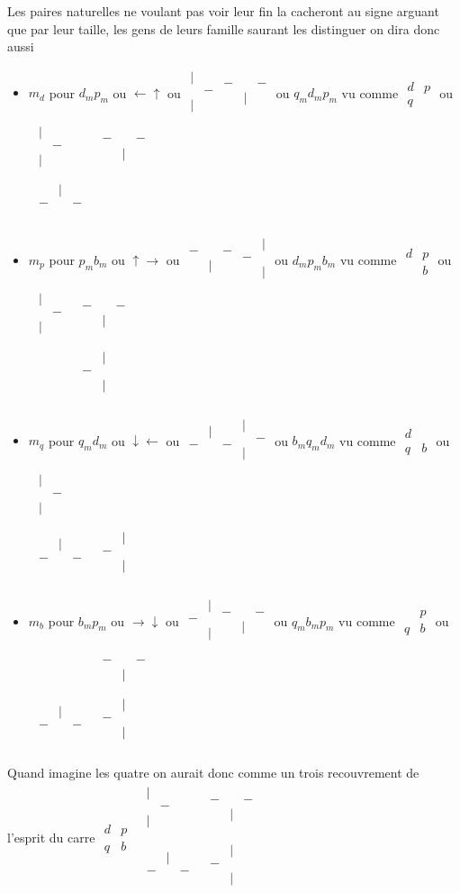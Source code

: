 \documentclass{article}
\newcommand{\dmat}{\scriptscriptstyle\begin{matrix}
|&   \\
  & - \\
 | &   \\
\end{matrix}}
\newcommand{\pmat}{\scriptscriptstyle\begin{matrix}
&  & \\
 - &&  -\\
  &|&  \\
\end{matrix}}
\newcommand{\qmat}{\scriptscriptstyle\begin{matrix}
& |&  \\
  -&&-  \\
  &&   \\
\end{matrix}}
\newcommand{\bmat}{\scriptscriptstyle\begin{matrix}
& |  \\
 - &  \\
  & |  \\
\end{matrix}}
\begin{document}
Les paires naturelles ne voulant pas voir leur fin la cacheront au signe arguant que par leur taille, les gens de leurs famille saurant les distinguer
 on dira donc aussi 
 \begin{itemize}
\item $m_d$ pour $d_mp_m$ ou  $\leftarrow \uparrow$ ou $\dmat \pmat$ ou $q_md_mp_m$ vu comme $\begin{matrix} d&p \\ q & \end{matrix}$ ou 
$\begin{array}{cc} \dmat & \pmat \\ \qmat& \end{array}$
\item $m_p$ pour $p_mb_m$ ou  $\uparrow\rightarrow $ ou $\pmat \bmat$ ou $d_mp_mb_m$ vu comme $\begin{matrix} d&p \\  & b\end{matrix}$ ou
 $\begin{array}{cc} \dmat & \pmat \\ &\bmat \end{array}$
\item $m_q$ pour $q_md_m$ ou  $\downarrow \leftarrow $ ou $\qmat \dmat$ ou $b_mq_md_m$ vu comme $\begin{matrix} d& \\ q & b \end{matrix}$ ou 
$\begin{array}{cc} \dmat &\\  \qmat & \bmat \end{array}$
\item $m_b$ pour $b_mp_m$ ou  $\rightarrow \downarrow$ ou $\bmat \pmat$ ou $q_mb_mp_m$ vu comme $\begin{matrix} &p \\ q &b \end{matrix}$ ou
 $\begin{array}{cc} &\pmat \\ \qmat&  \bmat \end{array}$
\end{itemize}
 
 Quand imagine  les quatre on aurait donc  comme un trois recouvrement de l'esprit du  carre  $\begin{matrix} d&p \\ q &b \end{matrix}$
  $\begin{array}{cc} \dmat &\pmat \\ \qmat&  \bmat \end{array}$
 
\end{document}
